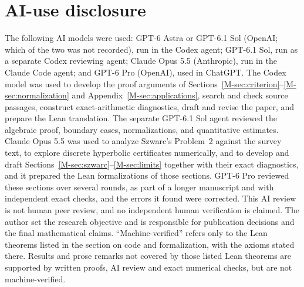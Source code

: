 \section*{AI-use disclosure}
The following AI models were used: GPT-6 Astra or GPT-6.1 Sol (OpenAI; which of the two was not recorded), run in the Codex agent; GPT-6.1 Sol, run as a separate Codex reviewing agent; Claude Opus 5.5 (Anthropic), run in the Claude Code agent; and GPT-6 Pro (OpenAI), used in ChatGPT. The Codex model was used to develop the proof arguments of Sections~\ref{M-sec:criterion}--\ref{M-sec:normalization} and Appendix~\ref{M-sec:applications}, search and check source passages, construct exact-arithmetic diagnostics, draft and revise the paper, and prepare the Lean translation. The separate GPT-6.1 Sol agent reviewed the algebraic proof, boundary cases, normalizations, and quantitative estimates. Claude Opus 5.5 was used to analyze Szwarc's Problem~2 against the survey text, to explore discrete hyperbolic certificates numerically, and to develop and draft Sections~\ref{M-sec:szwarc}--\ref{M-sec:limits} together with their exact diagnostics, and it prepared the Lean formalizations of those sections. GPT-6 Pro reviewed these sections over several rounds, as part of a longer manuscript and with independent exact checks, and the errors it found were corrected. This AI review is not human peer review, and no independent human verification is claimed. The author set the research objective and is responsible for publication decisions and the final mathematical claims. ``Machine-verified'' refers only to the Lean theorems listed in the section on code and formalization, with the axioms stated there. Results and prose remarks not covered by those listed Lean theorems are supported by written proofs, AI review and exact numerical checks, but are not machine-verified.

